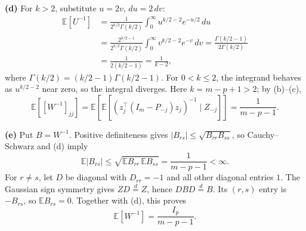 \documentclass[11pt]{article}
\newcommand{\E}{\mathbb E}
\begin{document}
\textbf{(d)} For $k>2$, substitute $u=2v$, $du=2\,dv$:
\begin{align*}
 \E[U^{-1}]
 &=\frac{1}{2^{k/2}\Gamma(k/2)}
 \int_0^\infty u^{k/2-2}e^{-u/2}\,du\\
 &=\frac{2^{k/2-1}}{2^{k/2}\Gamma(k/2)}
 \int_0^\infty v^{k/2-2}e^{-v}\,dv
 =\frac{\Gamma(k/2-1)}{2\Gamma(k/2)}\\
 &=\frac{1}{2(k/2-1)}=\frac1{k-2},
\end{align*}
where $\Gamma(k/2)=(k/2-1)\Gamma(k/2-1)$.
For $0<k\leq2$, the integrand behaves as $u^{k/2-2}$ near zero,
so the integral diverges. Here $k=m-p+1>2$; by (b)--(c),
\[
 \E[[W^{-1}]_{jj}]
 =\E\!\left[\E\!\left[(z_j^\top(I_m-P_{-j})z_j)^{-1}\mid Z_{-j}\right]\right]
 =\frac1{m-p-1}.
\]

\textbf{(e)} Put $B=W^{-1}$. Positive definiteness gives
$|B_{rs}|\leq\sqrt{B_{rr}B_{ss}}$, so Cauchy--Schwarz and (d) imply
\[
 \E|B_{rs}|\leq\sqrt{\E B_{rr}\,\E B_{ss}}
 =\frac1{m-p-1}<\infty.
\]
For $r\ne s$, let $D$ be diagonal with $D_{rr}=-1$ and all other
diagonal entries $1$. The Gaussian sign symmetry gives
$ZD\overset d=Z$, hence $DBD\overset d=B$.
Its $(r,s)$ entry is $-B_{rs}$, so $\E B_{rs}=0$.
Together with (d), this proves
\[
 \boxed{\E[W^{-1}]=\frac{I_p}{m-p-1}.}
\]
\end{document}
